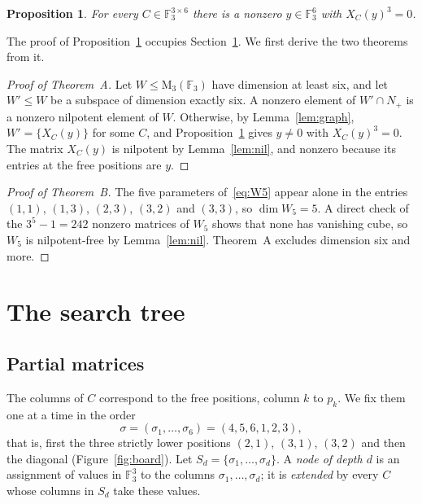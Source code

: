 \documentclass[11pt]{amsart}
\newtheorem{proposition}[theorem]{Proposition}
\theoremstyle{definition}
\theoremstyle{remark}
\numberwithin{equation}{section}
\newcommand{\F}{\mathbb{F}}
\newcommand{\M}{\mathrm{M}}
\begin{document}
\begin{proposition}\label{prop:finite}
For every $C\in\F_3^{3\times6}$ there is a nonzero $y\in\F_3^6$ with $X_C(y)^3=0$.
\end{proposition}

The proof of Proposition~\ref{prop:finite} occupies Section~\ref{sec:tree}. We first derive the two theorems from it.

\begin{proof}[Proof of Theorem~A]
Let $W\le\M_3(\F_3)$ have dimension at least six, and let $W'\le W$ be a subspace of dimension exactly six. A nonzero element of $W'\cap N_+$ is a nonzero nilpotent element of $W$. Otherwise, by Lemma~\ref{lem:graph}, $W'=\{X_C(y)\}$ for some $C$, and Proposition~\ref{prop:finite} gives $y\ne0$ with $X_C(y)^3=0$. The matrix $X_C(y)$ is nilpotent by Lemma~\ref{lem:nil}, and nonzero because its entries at the free positions are $y$.
\end{proof}

\begin{proof}[Proof of Theorem~B]
The five parameters of~\eqref{eq:W5} appear alone in the entries $(1,1)$, $(1,3)$, $(2,3)$, $(3,2)$ and $(3,3)$, so $\dim W_5=5$. A direct check of the $3^5-1=242$ nonzero matrices of $W_5$ shows that none has vanishing cube, so $W_5$ is nilpotent-free by Lemma~\ref{lem:nil}. Theorem~A excludes dimension six and more.
\end{proof}

\section{The search tree}\label{sec:tree}

\subsection{Partial matrices}
The columns of $C$ correspond to the free positions, column $k$ to $p_k$. We fix them one at a time in the order
\begin{equation}\label{eq:order}
\sigma=(\sigma_1,\dots,\sigma_6)=(4,5,6,1,2,3),
\end{equation}
that is, first the three strictly lower positions $(2,1)$, $(3,1)$, $(3,2)$ and then the diagonal (Figure~\ref{fig:board}). Let $S_d=\{\sigma_1,\dots,\sigma_d\}$. A \emph{node of depth $d$} is an assignment of values in $\F_3^3$ to the columns $\sigma_1,\dots,\sigma_d$; it is \emph{extended} by every $C$ whose columns in $S_d$ take these values.
\end{document}
